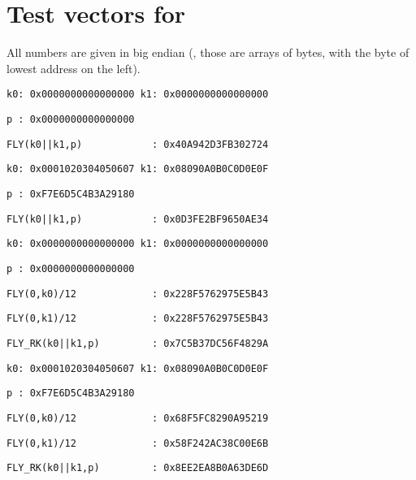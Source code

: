 \section{Test vectors for \fly}

All numbers are given in big endian (\ie, those are arrays of bytes, with the byte of lowest address on the left).

\medskip

\noindent
\verb+k0: 0x0000000000000000 k1: 0x0000000000000000+

\noindent
\verb+p : 0x0000000000000000+

\noindent
\verb+FLY(k0||k1,p)            : 0x40A942D3FB302724+
 
\medskip

\noindent
\verb+k0: 0x0001020304050607 k1: 0x08090A0B0C0D0E0F+

\noindent
\verb+p : 0xF7E6D5C4B3A29180+

\noindent
\verb+FLY(k0||k1,p)            : 0x0D3FE2BF9650AE34+

\medskip

\noindent
\verb+k0: 0x0000000000000000 k1: 0x0000000000000000+

\noindent
\verb+p : 0x0000000000000000+

\noindent
\verb+FLY(0,k0)/12         	   : 0x228F5762975E5B43+

\noindent
\verb+FLY(0,k1)/12         	   : 0x228F5762975E5B43+

\noindent
\verb+FLY_RK(k0||k1,p)         : 0x7C5B37DC56F4829A+

\medskip

\noindent
\verb+k0: 0x0001020304050607 k1: 0x08090A0B0C0D0E0F+

\noindent
\verb+p : 0xF7E6D5C4B3A29180+

\noindent
\verb+FLY(0,k0)/12         	   : 0x68F5FC8290A95219+

\noindent
\verb+FLY(0,k1)/12         	   : 0x58F242AC38C00E6B+

\noindent
\verb+FLY_RK(k0||k1,p)         : 0x8EE2EA8B0A63DE6D+
